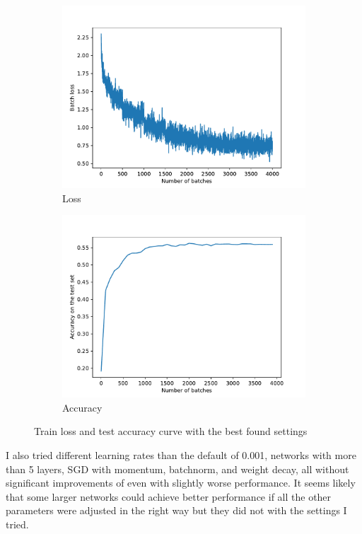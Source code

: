 \documentclass{article}
\begin{document}
\begin{figure}
  \centering
  \begin{subfigure}{.49\linewidth}
    \includegraphics[width=\linewidth]{fig/pytorch_mlp/loss_curve.pdf}
    \caption{Loss}
  \end{subfigure}
  \begin{subfigure}{.49\linewidth}
    \includegraphics[width=\linewidth]{fig/pytorch_mlp/accuracy_curve.pdf}
    \caption{Accuracy}
  \end{subfigure}
  \caption{Train loss and test accuracy curve with the best found settings}
  \label{fig:pytorch}
\end{figure}

I also tried different learning rates than the default of 0.001, networks with more than 5 layers,
SGD with momentum, batchnorm, and weight decay, all without significant improvements of even with slightly worse
performance. It seems likely that some larger networks could achieve better performance
if all the other parameters were adjusted in the right way but they did not with the settings
I tried.
\end{document}
